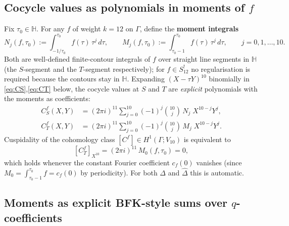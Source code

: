 \documentclass[11pt,letterpaper]{article}
\newcommand{\HH}{\mathbb{H}}
\newcommand{\Dhat}{\widehat{\Delta}}
\begin{document}
\subsection{Cocycle values as polynomials in moments of \texorpdfstring{$f$}{f}}

Fix $\tau_0 \in \HH$.  For any $f$ of weight $k=12$ on $\Gamma$, define the
\textbf{moment integrals}
\begin{equation}\label{eq:moments}
  N_j(f,\tau_0) := \int_{-1/\tau_0}^{\tau_0}\!\! f(\tau)\,\tau^j\,d\tau,
  \qquad
  M_j(f,\tau_0) := \int_{\tau_0-1}^{\tau_0}\!\! f(\tau)\,\tau^j\,d\tau,
  \qquad j = 0, 1, \ldots, 10.
\end{equation}
Both are well-defined finite-contour integrals of $f$ over straight line
segments in $\HH$ (the $S$-segment and the $T$-segment respectively); for
$f \in S_{12}^!$ no regularisation is required because the contours stay in
$\HH$.  Expanding $(X - \tau Y)^{10}$ binomially in \eqref{eq:CS},\eqref{eq:CT}
below, the cocycle values at $S$ and $T$ are \emph{explicit} polynomials with
the moments as coefficients:
\begin{align}
  C_S^f(X,Y) &= (2\pi i)^{11}\sum_{j=0}^{10}(-1)^j\binom{10}{j}\,N_j\;X^{10-j}Y^j,
  \label{eq:CS}\\
  C_T^f(X,Y) &= (2\pi i)^{11}\sum_{j=0}^{10}(-1)^j\binom{10}{j}\,M_j\;X^{10-j}Y^j.
  \label{eq:CT}
\end{align}
Cuspidality of the cohomology class $[C^f] \in H^1(\Gamma; V_{10})$ is
equivalent to
\begin{equation}\label{eq:cuspidality}
  [C_T^f]_{X^{10}} = (2\pi i)^{11}\,M_0(f, \tau_0) = 0,
\end{equation}
which holds whenever the constant Fourier coefficient $c_f(0)$ vanishes (since
$M_0 = \int_{\tau_0-1}^{\tau_0}f = c_f(0)$ by periodicity). For both $\Delta$
and $\Dhat$ this is automatic.

\subsection{Moments as explicit BFK-style sums over $q$-coefficients}\label{ssec:moments-qexp}
\end{document}
